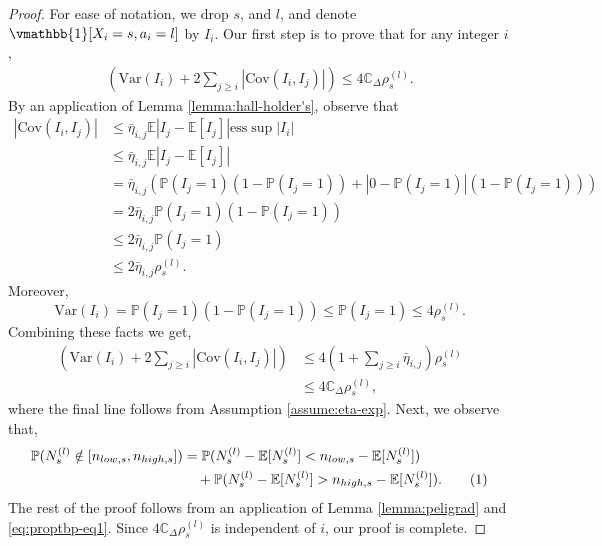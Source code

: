 \documentclass[opre,sglanonrev]{informs4}
\numberwithin{equation}{section}
\newcommand{\pow}[1]{^{(#1)}}
\newcommand{\lp}{\left(}
\newcommand{\rp}{\right)}
\newcommand{\lv}{\left|}
\newcommand{\rv}{\right|}
\newcommand{\Var}{\mathrm{Var}}
\newcommand{\Cov}{\mathrm{Cov}}
\newcommand{\Cbb}{\mathbb{C}}
\newcommand{\Pbb}{\mathbb{P}}
\newcommand{\constant}{\Cbb}
\newcommand\numberthis{\addtocounter{equation}{1}\tag{\theequation}}
\newcommand{\prob}{\Pbb}
\newcommand{\expec}{\mathbb{E}}
\newcommand{\indicator}{\vmathbb{1}}
\begin{document}
\begin{APPENDICES}
\begin{proof}
For ease of notation, we drop $s$, and $l$, and denote $\indicator[X_i=s,a_i=l]$ by $I_i$. Our first step is to prove that for any integer $i$,
\begin{align*}
    \lp \Var(I_i) +2\sum_{j\geq i}|\Cov(I_i,I_j)|\rp\leq 4\constant_\Delta\rho_s\pow{l}.
\end{align*}
By an application of Lemma \ref{lemma:hall-holder's}, observe that
\begin{align*}
    |\Cov(I_i,I_j)|&\leq \bar\eta_{i,j}\expec|I_j-\expec[I_j]|\mathrm{ess}\sup|I_i|\\
    & \leq \bar\eta_{i,j}\expec|I_j-\expec[I_j]|\\
    & = \bar\eta_{i,j}\lp\prob\lp I_j=1\rp\lp1-\prob\lp I_j=1\rp\rp+\lv0-\prob\lp I_j=1\rp\rv\lp1-\prob\lp I_j=1\rp\rp\rp\\
    & = 2\bar\eta_{i,j}\prob\lp I_j=1\rp\lp1-\prob\lp I_j=1\rp\rp\\
    & \leq 2\bar\eta_{i,j}\prob\lp I_j=1\rp\\
    & \leq 2\bar\eta_{i,j}\rho_s\pow{l}.
\end{align*}
Moreover,
\[
\Var(I_i)=\prob\lp I_j=1\rp\lp1-\prob\lp I_j=1\rp\rp\leq \prob\lp I_j=1\rp\leq 4\rho_s\pow{l}.
\]
Combining these facts we get,
\begin{align*}
     \lp \Var(I_i) +2\sum_{j\geq i}|\Cov(I_i,I_j)|\rp & \leq 4\lp1+\sum_{j\geq i}\bar\eta_{i,j}\rp\rho_s\pow{l}\\
     & \leq 4\constant_\Delta\rho_s\pow{l},
\end{align*}
where the final line follows from Assumption \ref{assume:eta-exp}. Next, we observe that,
\begin{align*}
    \prob(N_s^{(l)}\notin [n_{low,s} ,n_{high,s}]) & = \prob(N_s^{(l)}-\expec[N_s\pow{l}]< n_{low,s}-\expec[N_s\pow{l}])\\
    & \quad +\prob(N_s^{(l)}-\expec[N_s\pow{l}]>n_{high,s}-\expec[N_s\pow{l}]).\numberthis\label{eq:proptbp-eq1}
\end{align*}
The rest of the proof follows from an application of Lemma \ref{lemma:peligrad} and \cref{eq:proptbp-eq1}. Since  $4\constant_\Delta\rho_s\pow{l}$ is independent of $i$, our proof is complete. 
\end{proof}

\end{APPENDICES}
\end{document}
